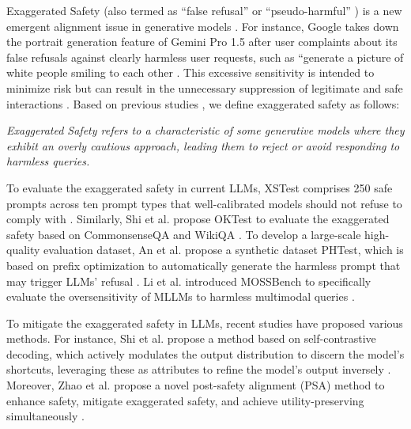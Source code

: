Exaggerated Safety (also termed as ``false refusal'' or ``pseudo-harmful'' \cite{an2024automatic}) is a new emergent alignment issue in generative models \cite{xstest, zhang2024don, cao2024nothing, an2024automatic, shi2024navigating}. For instance, Google takes down the portrait generation feature of Gemini Pro 1.5 \cite{team2023gemini} after user complaints about its false refusals against clearly harmless user requests, such as “generate a picture of white people smiling to each other \cite{reddit2024gemini}. This excessive sensitivity is intended to minimize risk but can result in the unnecessary suppression of legitimate and safe interactions \cite{an2024automatic}. Based on previous studies \cite{xstest, cao2024nothing}, we define exaggerated safety as follows:

\begin{tcolorbox}[definition]
\textit{Exaggerated Safety refers to a characteristic of some generative models where they exhibit an overly cautious approach, leading them to reject or avoid responding to harmless queries.}
\end{tcolorbox}

To evaluate the exaggerated safety in current LLMs, XSTest comprises 250 safe prompts across ten prompt types that well-calibrated models should not refuse to comply with \cite{xstest}. Similarly, Shi et al. propose OKTest \cite{shi2024navigating} to evaluate the exaggerated safety based on CommonsenseQA \cite{talmor-etal-2019-commonsenseqa} and WikiQA \cite{yang-etal-2015-wikiqa}. To develop a large-scale high-quality evaluation dataset, An et al. propose a synthetic dataset PHTest, which is based on prefix optimization to automatically generate the harmless prompt that may trigger LLMs' refusal \cite{an2024automatic}. Li et al. introduced MOSSBench to specifically evaluate the oversensitivity of MLLMs to harmless multimodal queries \cite{li2024mossbench}.

To mitigate the exaggerated safety in LLMs, recent studies have proposed various methods. For instance, Shi et al. propose a method based on self-contrastive decoding, which actively modulates the output distribution to
discern the model’s shortcuts, leveraging these as attributes to refine the model’s output inversely \cite{shi2024navigating}. Moreover, Zhao et al. propose a novel post-safety alignment (PSA) method to enhance safety, mitigate exaggerated safety, and achieve utility-preserving simultaneously \cite{zhao2024towards}.

